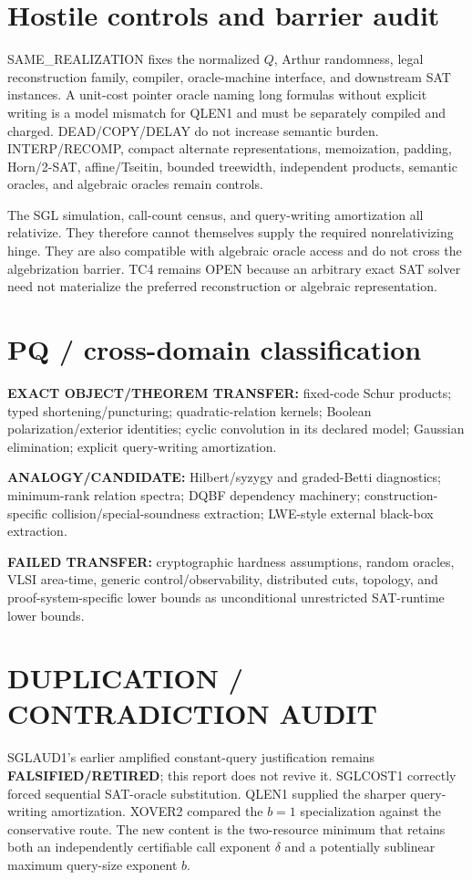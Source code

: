 \documentclass[11pt]{article}
\begin{document}
\section*{Hostile controls and barrier audit}
SAME\_REALIZATION fixes the normalized $Q$, Arthur randomness, legal reconstruction family, compiler, oracle-machine interface, and downstream SAT instances. A unit-cost pointer oracle naming long formulas without explicit writing is a model mismatch for QLEN1 and must be separately compiled and charged. DEAD/COPY/DELAY do not increase semantic burden. INTERP/RECOMP, compact alternate representations, memoization, padding, Horn/2-SAT, affine/Tseitin, bounded treewidth, independent products, semantic oracles, and algebraic oracles remain controls.

The SGL simulation, call-count census, and query-writing amortization all relativize. They therefore cannot themselves supply the required nonrelativizing hinge. They are also compatible with algebraic oracle access and do not cross the algebrization barrier. TC4 remains OPEN because an arbitrary exact SAT solver need not materialize the preferred reconstruction or algebraic representation.

\section*{PQ / cross-domain classification}
\textbf{EXACT OBJECT/THEOREM TRANSFER:} fixed-code Schur products; typed shortening/puncturing; quadratic-relation kernels; Boolean polarization/exterior identities; cyclic convolution in its declared model; Gaussian elimination; explicit query-writing amortization.

\textbf{ANALOGY/CANDIDATE:} Hilbert/syzygy and graded-Betti diagnostics; minimum-rank relation spectra; DQBF dependency machinery; construction-specific collision/special-soundness extraction; LWE-style external black-box extraction.

\textbf{FAILED TRANSFER:} cryptographic hardness assumptions, random oracles, VLSI area-time, generic control/observability, distributed cuts, topology, and proof-system-specific lower bounds as unconditional unrestricted SAT-runtime lower bounds.

\section*{DUPLICATION / CONTRADICTION AUDIT}
SGLAUD1's earlier amplified constant-query justification remains \textbf{FALSIFIED/RETIRED}; this report does not revive it. SGLCOST1 correctly forced sequential SAT-oracle substitution. QLEN1 supplied the sharper query-writing amortization. XOVER2 compared the $b=1$ specialization against the conservative route. The new content is the two-resource minimum that retains both an independently certifiable call exponent $\delta$ and a potentially sublinear maximum query-size exponent $b$.
\end{document}
